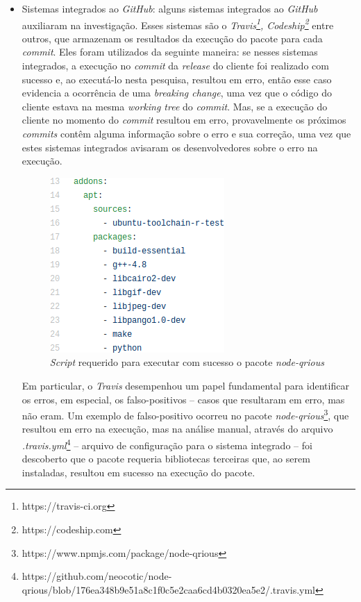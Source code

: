 \begin{itemize}
    \item Sistemas integrados ao \textit{GitHub}: alguns sistemas integrados ao \textit{GitHub} auxiliaram na investigação. Esses sistemas são o \textit{Travis\footnote{https://travis-ci.org}, Codeship\footnote{https://codeship.com}} entre outros, que armazenam os resultados da execução do pacote para cada \textit{commit}. Eles foram utilizados da seguinte maneira: se nesses sistemas integrados, a execução no \textit{commit} da \textit{release} do cliente foi realizado com sucesso e, ao executá-lo nesta pesquisa, resultou em erro, então esse caso evidencia a ocorrência de uma \textit{breaking change}, uma vez que o código do cliente estava na mesma \textit{working tree} do \textit{commit}. Mas, se a execução do cliente no momento do \textit{commit} resultou em erro, provavelmente os próximos \textit{commits} contêm alguma informação sobre o erro e sua correção, uma vez que estes sistemas integrados avisaram os desenvolvedores sobre o erro na execução.
    
    \begin{figure}
        \centering
        \includegraphics[scale=0.6]{figuras/false_positive.png}
        \caption{\textit{Script} requerido para executar com sucesso o pacote \textit{node-qrious}}
        \label{fig:false-positive}
    \end{figure}{}

    Em particular, o \textit{Travis} desempenhou um papel fundamental para identificar os erros, em especial, os falso-positivos -- casos que resultaram em erro, mas não eram. Um exemplo de falso-positivo ocorreu no pacote \textit{node-qrious}\footnote{https://www.npmjs.com/package/node-qrious}, que resultou em erro na execução, mas na análise manual, através do arquivo \textit{.travis.yml}\footnote{https://github.com/neocotic/node-qrious/blob/176ea348b9e51a8c1f0c5e2caa6cd4b0320ea5e2/.travis.yml} -- arquivo de configuração para o sistema integrado -- foi descoberto que o pacote requeria bibliotecas terceiras que, ao serem instaladas, resultou em sucesso na execução do pacote.
\end{itemize}{}

